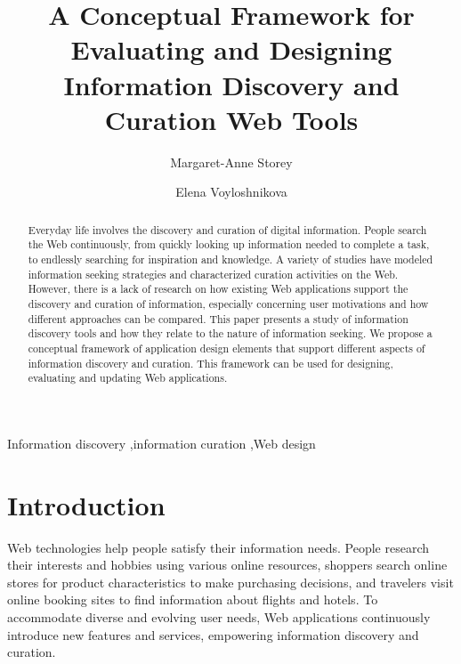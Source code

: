 \documentclass[review]{elsarticle}
\begin{document}
\begin{frontmatter}

\title{A Conceptual Framework for Evaluating and Designing Information Discovery and Curation Web Tools}



\author[peggyemail]{Margaret-Anne Storey}
\author[elenaemail]{Elena Voyloshnikova}
\address{University of Victoria}
\address{3800 Finnerty Rd, Victoria, BC, Canada, V8P 5C2}

\address[peggyemail]{mstorey@uvic.ca}
\address[elenaemail]{elenavoy@uvic.ca}




\begin{abstract}
Everyday life involves the discovery and curation of digital information. People search the Web continuously, from quickly looking up information needed to complete a task, to endlessly searching for inspiration and knowledge. A variety of studies have modeled information seeking strategies and characterized curation activities on the Web. However, there is a lack of research on how existing Web applications support the discovery and curation of information, especially concerning user motivations and how different approaches can be compared. This paper presents a study of information discovery tools and how they relate to the nature of information seeking. We propose a conceptual framework of application design elements that support different aspects of information discovery and curation. This framework can be used for designing, evaluating and updating Web applications.
\end{abstract}

\begin{keyword}
Information discovery \sep information curation \sep Web design
\end{keyword}

\end{frontmatter}

\linenumbers

\section{Introduction}

Web technologies help people satisfy their information needs. People research their interests and hobbies using various online resources, shoppers search online stores for product characteristics to make purchasing decisions, and travelers visit online booking sites to find information about flights and hotels. To accommodate diverse and evolving user needs, Web applications continuously introduce new features and services, empowering information discovery and curation. 
\end{document}
